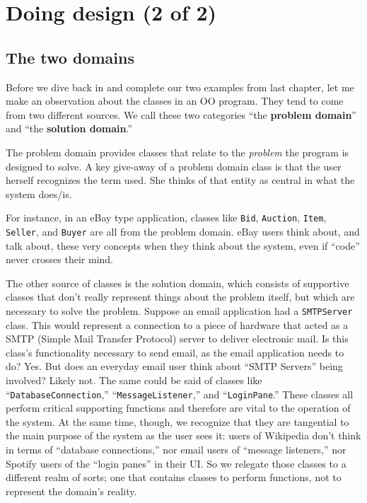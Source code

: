 
\chapter{Doing design (2 of 2)}
\label{design2}

\section{The two domains}

Before we dive back in and complete our two examples from last chapter, let me
make an observation about the classes in an OO program. They tend to come from
two different sources. We call these two categories ``the \textbf{problem
domain}'' and ``the \textbf{solution domain}.''

The problem domain provides classes that relate to the \textit{problem} the
program is designed to solve. A key give-away of a problem domain class is
that the user herself recognizes the term used. She thinks of that entity as
central in what the system does/is.

For instance, in an eBay type application, classes like \texttt{Bid},
\texttt{Auction}, \texttt{Item}, \texttt{Seller}, and \texttt{Buyer} are all
from the problem domain. eBay users think about, and talk about, these very
concepts when they think about the system, even if ``code'' never crosses their
mind.

The other source of classes is the solution domain, which consists of
supportive classes that don't really represent things about the problem
itself, but which are necessary to solve the problem. Suppose an email
application had a \texttt{SMTPServer} class. This would represent a connection
to a piece of hardware that acted as a SMTP (Simple Mail Transfer Protocol)
server to deliver electronic mail. Is this class's functionality necessary to
send email, as the email application needs to do? Yes. But does an everyday
email user think about ``SMTP Servers'' being involved? Likely not. The same
could be said of classes like ``\texttt{DatabaseConnection},''
``\texttt{MessageListener},'' and ``\texttt{LoginPane}.''  These classes all
perform critical supporting functions and therefore are vital to the operation
of the system. At the same time, though, we recognize that they are tangential
to the main purpose of the system as the user sees it: users of Wikipedia
don't think in terms of ``database connections,'' nor email users of ``message
listeners,'' nor Spotify users of the ``login panes'' in their UI. So we
relegate those classes to a different realm of sorts; one that contains
classes to perform functions, not to represent the domain's reality.

